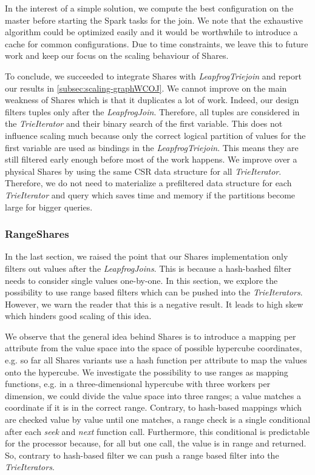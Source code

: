 In the interest of a simple solution, we compute the best configuration on the master before starting the Spark
tasks for the join.
We note that the exhaustive algorithm could be optimized easily and it would be worthwhile to introduce
a cache for common configurations.
Due to time constraints, we leave this to future work and keep our focus on the scaling behaviour of Shares.

To conclude, we succeeded to integrate Shares with \textit{LeapfrogTriejoin} and report our results in \cref{subsec:scaling-graphWCOJ}.
We cannot improve on the main weakness of Shares which is that it duplicates a lot of work.
Indeed, our design filters tuples only after the \textit{LeapfrogJoin}.
Therefore, all tuples are considered in the \textit{TrieIterator} and their binary search of the first variable.
This does not influence scaling much because only the correct logical partition of values for the first variable
are used as bindings in the \textit{LeapfrogTriejoin}.
This means they are still filtered early enough before most of the work happens.
We improve over a physical Shares by using the same CSR data structure for all \textit{TrieIterator}.
Therefore, we do not need to materialize a prefiltered data structure for each \textit{TrieIterator} and query which saves time and memory
if the partitions become large for bigger queries.

\subsubsection{RangeShares} \label{subsubsec:range-shares}
In the last section, we raised the point that our Shares implementation only filters out values after the
\textit{LeapfrogJoins}.
This is because a hash-bashed filter needs to consider single values one-by-one.
In this section, we explore the possibility to use range based filters which can be pushed into the \textit{TrieIterators}.
However, we warn the reader that this is a negative result.
It leads to high skew which hinders good scaling of this idea.

We observe that the general idea behind Shares is to introduce a mapping per attribute from the value space into the space of possible
hypercube coordinates, e.g. so far all Shares variants use a hash function per attribute to map the values onto the hypercube.
We investigate the possibility to use ranges as mapping functions, e.g. in a three-dimensional hypercube with three workers per dimension,
we could divide the value space into three ranges; a value matches a coordinate if it is in the correct range.
Contrary, to hash-based mappings which are checked value by value until one matches, a range check is a single conditional after each
\textit{seek} and \textit{next} function call.
Furthermore, this conditional is predictable for the processor because, for all but one call, the value is in range and returned.
So, contrary to hash-based filter we can push a range based filter into the \textit{TrieIterators}.


